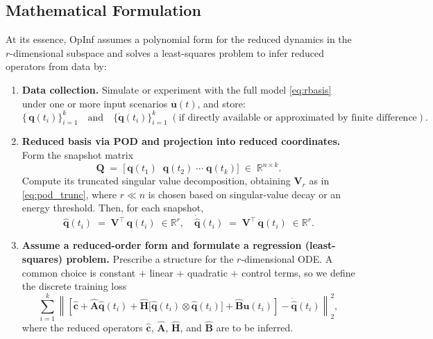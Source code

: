 \subsection*{Mathematical Formulation}
At its essence, OpInf assumes a polynomial form for the reduced dynamics in the $r$-dimensional subspace and solves a least-squares problem to infer reduced operators from data by:

\begin{enumerate}[label=\arabic*)]
    \item \textbf{Data collection.} Simulate or experiment with the full model \eqref{eq:rbasis} under one or more input scenarios $\mathbf{u}(t)$, and store:\\
    \[
        \bigl\{\,\mathbf{q}(t_i)\bigr\}_{i=1}^k 
        \quad\text{and}\quad
        \bigl\{\dot{\mathbf{q}}(t_i)\bigr\}_{i=1}^k \;(\text{if directly available or approximated by finite difference}).
    \]

    \item \textbf{Reduced basis via POD and projection into reduced coordinates.} Form the snapshot matrix
    \[
        \mathbf{Q} \;=\; \bigl[\,\mathbf{q}(t_1)\;\;\mathbf{q}(t_2)\;\cdots\;\mathbf{q}(t_k)\bigr] \;\in\; \mathbb{R}^{n\times k}.
    \]
    Compute its truncated singular value decomposition, obtaining $\mathbf{V}_r$ as in \eqref{eq:pod_trunc}, 
    where $r\ll n$ is chosen based on singular-value decay or an energy threshold. Then, for each snapshot,\\
    \[
        \hat{\mathbf{q}}(t_i) \;=\; \mathbf{V}^{\top}\,\mathbf{q}(t_i)\;\in\mathbb{R}^r,\quad
        \dot{\hat{\mathbf{q}}}(t_i)\;=\;\mathbf{V}^{\top}\,\dot{\mathbf{q}}(t_i)\;\in\mathbb{R}^r.
    \]

    \item \textbf{Assume a reduced-order form and formulate a regression (least-squares) problem.} Prescribe a structure for the $r$-dimensional ODE. A common choice is constant + linear + quadratic + control terms, so we define the discrete training loss\\
\begin{equation}
    \sum_{i=1}^{k} \left\| \left[ \hat{\mathbf{c}} + \hat{\mathbf{A}}\hat{\mathbf{q}}(t_i) + \hat{\mathbf{H}}\bigl[ \hat{\mathbf{q}}(t_i) \otimes \hat{\mathbf{q}}(t_i) \bigr] + \hat{\mathbf{B}}\mathbf{u}(t_i) \right] - \dot{\hat{\mathbf{q}}}(t_i) \right\|_2^2,
    \label{loss_opinf}
\end{equation}
where the reduced operators $\hat{\mathbf{c}}$, $\hat{\mathbf{A}}$, $\hat{\mathbf{H}}$, and $\hat{\mathbf{B}}$ are to be inferred.


\end{enumerate}
